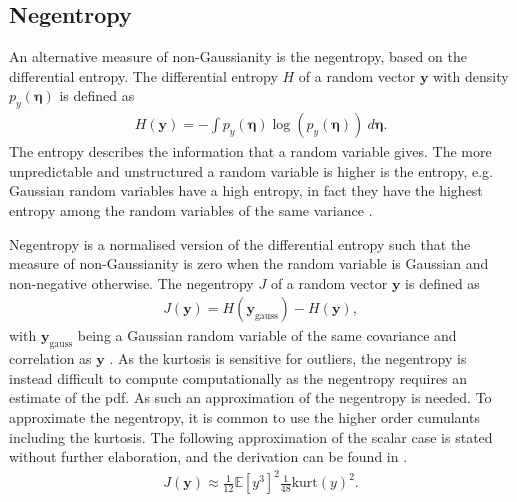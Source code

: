\subsection{Negentropy}
An alternative measure of non-Gaussianity is the negentropy, based on the differential entropy. The differential entropy $H$ of a random vector $\mathbf{y}$ with density $p_y (\boldsymbol{\eta})$ is defined as
\begin{align*}
H(\mathbf{y}) = - \int p_y (\boldsymbol{\eta}) \log (p_y (\boldsymbol{\eta})) \ d\boldsymbol{\eta}.
\end{align*}
The entropy describes the information that a random variable gives. The more unpredictable and unstructured a random variable is higher is the entropy, e.g. Gaussian random variables have a high entropy, in fact they have the highest entropy among the random variables of the same variance \cite[p. 182]{ICA}.

Negentropy is a normalised version of the differential entropy such that the measure of non-Gaussianity is zero when the random variable is Gaussian and non-negative otherwise. The negentropy $J$ of a random vector $\mathbf{y}$ is defined as 
\begin{align*}
J(\mathbf{y}) = H(\mathbf{y}_{\text{gauss}}) - H(\mathbf{y}),
\end{align*}
with $\mathbf{y}_{\text{gauss}}$ being a Gaussian random variable of the same covariance and correlation as $\mathbf{y}$ \cite[p. 182]{ICA}.
As the kurtosis is sensitive for outliers, the negentropy is instead difficult to compute computationally as the negentropy requires an estimate of the pdf. As such an approximation of the negentropy is needed.
To approximate the negentropy, it is common to use the higher order cumulants including the kurtosis. The following approximation of the scalar case is stated without further elaboration, and the derivation can be found in \cite[p. 183]{ICA}. 
\begin{align*}
J(\mathbf{y}) \approx \frac{1}{12} \mathbb{E}[y^{3}]^2 \frac{1}{48}\text{kurt}(y)^2.
\end{align*}

